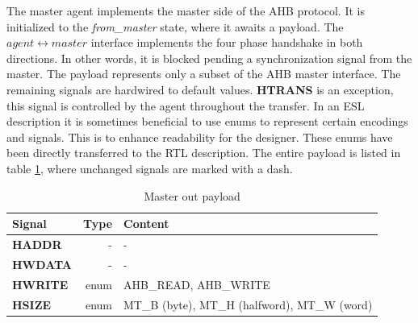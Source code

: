 The master agent implements the master side of the AHB protocol. It is initialized to the \textit{from\_master} state, where it awaits a payload. The $agent\leftrightarrow master$ interface implements the four phase handshake in both directions. In other words, it is blocked pending a synchronization signal from the master. The payload represents only a subset of the AHB master interface. The remaining signals are hardwired to default values. \textbf{HTRANS} is an exception, this signal is controlled by the agent throughout the transfer. In an ESL description it is sometimes beneficial to use enums to represent certain encodings and signals. This is to enhance readability for the designer. These enums have been directly transferred to the RTL description. The entire payload is listed in table \ref{tab:mpayload}, where unchanged signals are marked with a dash.  

\begin{table}[hbt] 
  \label{tab:mpayload}
  \begin{tabular}{|p{25mm}|r|p{10cm}|} 
  \hline
  \textbf{Signal} & \textbf{Type} & \textbf{Content} \\
    \hline
  \textbf{HADDR} & - & - \\
    \hline
  \textbf{HWDATA} & - & - \\
    \hline
  \textbf{HWRITE} & enum & AHB\_READ, AHB\_WRITE \\
    \hline  
\textbf{HSIZE} & enum & MT\_B (byte), MT\_H (halfword), MT\_W (word) \\
    \hline
  \end{tabular}
\caption{Master out payload}
\end{table}


